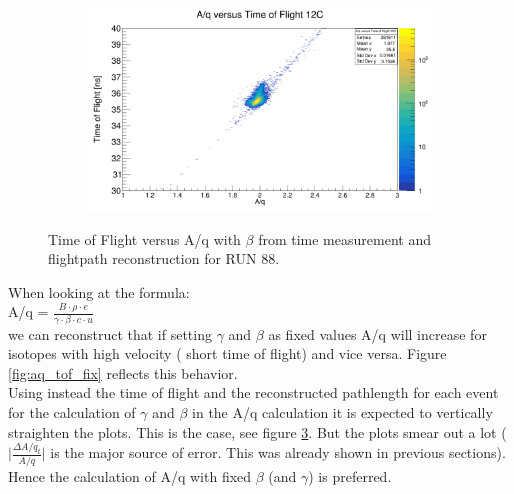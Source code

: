 \documentclass[12pt, letterpaper]{article}
\begin{document}
\begin{figure}[!htbp]
\begin{subfigure}{.5\textwidth}
  \caption{}
  \label{fig:sub-second}
\end{subfigure}
\begin{subfigure}{.5\textwidth}
  \centering
  \includegraphics[width=.9\linewidth]{aq_tof12c.png} 
  \caption{}
  \label{fig:sub-second}
\end{subfigure}
\caption{Time of Flight versus A/q with  $\beta$ from time measurement and flightpath reconstruction for RUN 88.}
\label{fig:aq_tof}
\end{figure}

When looking at the formula:\\
A/q = $\frac{B \cdot \rho \cdot e}{\gamma\cdot\beta \cdot c \cdot u}$ \\
we can reconstruct that if setting $\gamma$ and $\beta$ as fixed values A/q will increase for isotopes with high velocity ( short time of flight) and vice versa. Figure \ref{fig:aq_tof_fix} reflects this behavior.\\
Using instead the time of flight and the reconstructed pathlength for each event for the calculation of $\gamma$ and $\beta$ in the A/q calculation it is expected to vertically straighten the plots. This is the case, see figure \ref{fig:aq_tof}. But the plots smear out a lot ($\big|\frac{\Delta A/q_{t}}{A/q}\big|$ is the major source of error. This was already shown in previous sections). Hence the calculation of A/q with fixed $\beta$ (and $\gamma$) is preferred. 
\end{document}
